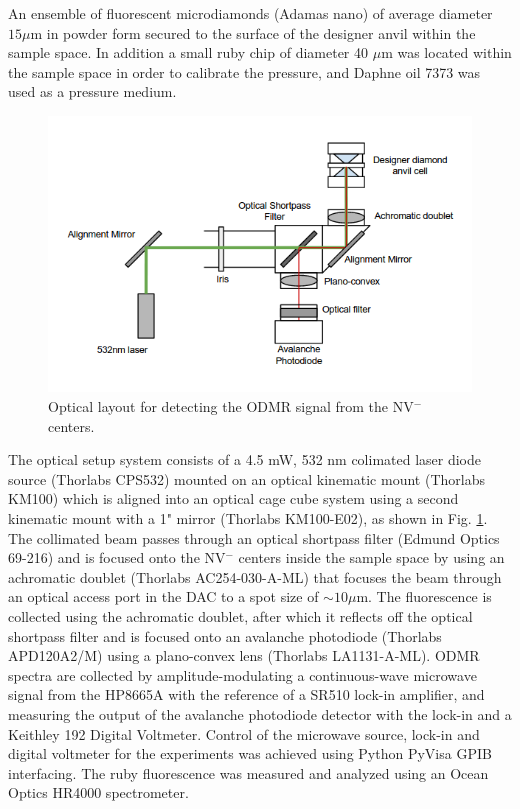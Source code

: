 \documentclass[%
 aip,
 sd,%
 amsmath,amssymb,
 reprint,%
 longbibliography
]{revtex4-1}
\begin{document}
An ensemble of fluorescent microdiamonds  (Adamas nano) of average diameter $15\mu$m in powder form secured to the surface of the designer anvil within the sample space. In addition a small ruby chip of diameter 40 $\mu$m was located within the sample space in order to calibrate the pressure, \cite{RubyCalibration} and Daphne oil 7373 was used as a pressure medium.\cite{DaphneOilHighPressure}

\begin{figure}[h]
\includegraphics[width=\linewidth]{set-upV3}%
\caption{\label{fig:setup} Optical layout for detecting the ODMR signal from the NV$^-$ centers. }
\end{figure}


The optical setup system consists of a 4.5 mW, 532 nm colimated laser diode source (Thorlabs CPS532) mounted on an optical kinematic mount (Thorlabs KM100) which is aligned into an optical cage cube system using a second kinematic mount with a 1" mirror (Thorlabs KM100-E02), as shown in Fig. \ref{fig:setup}.  The collimated beam passes through an optical shortpass filter (Edmund Optics 69-216) and is focused onto the NV$^-$ centers inside the sample space by using an achromatic doublet (Thorlabs AC254-030-A-ML) that focuses the beam through an optical access port in the DAC to a spot size of $\sim 10\mu$m.  The fluorescence is collected using the achromatic doublet, after which it reflects off the optical shortpass filter and is focused onto an avalanche photodiode (Thorlabs APD120A2/M) using a plano-convex lens (Thorlabs LA1131-A-ML).   ODMR spectra are collected by amplitude-modulating a continuous-wave microwave signal from the HP8665A with the reference of a SR510 lock-in amplifier, and measuring the output of the avalanche photodiode detector with the lock-in and a Keithley 192 Digital Voltmeter.\cite{ODMRnanodiamonds}
Control of the microwave source, lock-in and digital voltmeter for the experiments was achieved using Python PyVisa GPIB interfacing. The ruby fluorescence was measured and analyzed using an Ocean Optics HR4000 spectrometer.
\end{document}

